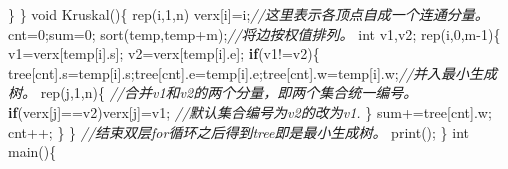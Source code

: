 \documentclass[
]{article}
\newenvironment{Shaded}{}{}
\newcommand{\CommentTok}[1]{\textcolor[rgb]{0.38,0.63,0.69}{\textit{#1}}}
\newcommand{\ControlFlowTok}[1]{\textcolor[rgb]{0.00,0.44,0.13}{\textbf{#1}}}
\newcommand{\DataTypeTok}[1]{\textcolor[rgb]{0.56,0.13,0.00}{#1}}
\newcommand{\DecValTok}[1]{\textcolor[rgb]{0.25,0.63,0.44}{#1}}
\newcommand{\NormalTok}[1]{#1}
\newcommand{\OperatorTok}[1]{\textcolor[rgb]{0.40,0.40,0.40}{#1}}
\begin{document}
\begin{Shaded}
\begin{Highlighting}[]
	\OperatorTok{\}}
\OperatorTok{\}}
\DataTypeTok{void}\NormalTok{ Kruskal}\OperatorTok{()\{}
\NormalTok{	rep}\OperatorTok{(}\NormalTok{i}\OperatorTok{,}\DecValTok{1}\OperatorTok{,}\NormalTok{n}\OperatorTok{)}
\NormalTok{		verx}\OperatorTok{[}\NormalTok{i}\OperatorTok{]=}\NormalTok{i}\OperatorTok{;}\CommentTok{//这里表示各顶点自成一个连通分量。}
\NormalTok{	cnt}\OperatorTok{=}\DecValTok{0}\OperatorTok{;}\NormalTok{sum}\OperatorTok{=}\DecValTok{0}\OperatorTok{;}
\NormalTok{	sort}\OperatorTok{(}\NormalTok{temp}\OperatorTok{,}\NormalTok{temp}\OperatorTok{+}\NormalTok{m}\OperatorTok{);}\CommentTok{//将边按权值排列。}
	\DataTypeTok{int}\NormalTok{ v1}\OperatorTok{,}\NormalTok{v2}\OperatorTok{;}
\NormalTok{	rep}\OperatorTok{(}\NormalTok{i}\OperatorTok{,}\DecValTok{0}\OperatorTok{,}\NormalTok{m}\OperatorTok{{-}}\DecValTok{1}\OperatorTok{)\{}
\NormalTok{		v1}\OperatorTok{=}\NormalTok{verx}\OperatorTok{[}\NormalTok{temp}\OperatorTok{[}\NormalTok{i}\OperatorTok{].}\NormalTok{s}\OperatorTok{];}
\NormalTok{		v2}\OperatorTok{=}\NormalTok{verx}\OperatorTok{[}\NormalTok{temp}\OperatorTok{[}\NormalTok{i}\OperatorTok{].}\NormalTok{e}\OperatorTok{];}
		\ControlFlowTok{if}\OperatorTok{(}\NormalTok{v1}\OperatorTok{!=}\NormalTok{v2}\OperatorTok{)\{}
\NormalTok{tree}\OperatorTok{[}\NormalTok{cnt}\OperatorTok{].}\NormalTok{s}\OperatorTok{=}\NormalTok{temp}\OperatorTok{[}\NormalTok{i}\OperatorTok{].}\NormalTok{s}\OperatorTok{;}\NormalTok{tree}\OperatorTok{[}\NormalTok{cnt}\OperatorTok{].}\NormalTok{e}\OperatorTok{=}\NormalTok{temp}\OperatorTok{[}\NormalTok{i}\OperatorTok{].}\NormalTok{e}\OperatorTok{;}\NormalTok{tree}\OperatorTok{[}\NormalTok{cnt}\OperatorTok{].}\NormalTok{w}\OperatorTok{=}\NormalTok{temp}\OperatorTok{[}\NormalTok{i}\OperatorTok{].}\NormalTok{w}\OperatorTok{;}\CommentTok{//并入最小生成树。}
\NormalTok{			rep}\OperatorTok{(}\NormalTok{j}\OperatorTok{,}\DecValTok{1}\OperatorTok{,}\NormalTok{n}\OperatorTok{)\{}
				\CommentTok{//合并v1和v2的两个分量，即两个集合统一编号。}
				\ControlFlowTok{if}\OperatorTok{(}\NormalTok{verx}\OperatorTok{[}\NormalTok{j}\OperatorTok{]==}\NormalTok{v2}\OperatorTok{)}\NormalTok{verx}\OperatorTok{[}\NormalTok{j}\OperatorTok{]=}\NormalTok{v1}\OperatorTok{;} \CommentTok{//默认集合编号为v2的改为v1.}
			\OperatorTok{\}}
\NormalTok{			sum}\OperatorTok{+=}\NormalTok{tree}\OperatorTok{[}\NormalTok{cnt}\OperatorTok{].}\NormalTok{w}\OperatorTok{;}
\NormalTok{			cnt}\OperatorTok{++;}
		\OperatorTok{\}}
	\OperatorTok{\}}
	\CommentTok{//结束双层for循环之后得到tree即是最小生成树。}
\NormalTok{	print}\OperatorTok{();}
\OperatorTok{\}}
\DataTypeTok{int}\NormalTok{ main}\OperatorTok{()\{}

\end{Highlighting}
\end{Shaded}
\end{document}
